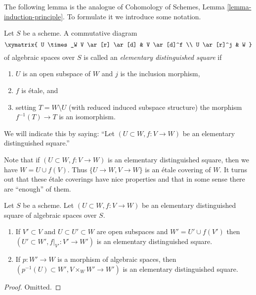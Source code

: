 \noindent
The following lemma is the analogue of
Cohomology of Schemes, Lemma \ref{lemma-induction-principle}.
To formulate it we introduce some notation.

\begin{definition}
\label{definition-elementary-distinguished-square}
Let $S$ be a scheme. A commutative diagram
$$
\xymatrix{
U \times_W V \ar[r] \ar[d] & V \ar[d]^f \\
U \ar[r]^j & W
}
$$
of algebraic spaces over $S$ is called an {\it elementary distinguished square}
if
\begin{enumerate}
\item $U$ is an open subspace of $W$ and $j$ is the inclusion morphism,
\item $f$ is \'etale, and
\item setting $T = W \setminus U$ (with reduced induced
subspace structure) the morphism $f^{-1}(T) \to T$ is an isomorphism.
\end{enumerate}
We will indicate this by saying: ``Let $(U \subset W, f : V \to W)$
be an elementary distinguished square.''
\end{definition}

\noindent
Note that if $(U \subset W, f : V \to W)$ is an elementary distinguished
square, then we have $W = U \cup f(V)$. Thus $\{U \to W, V \to W\}$ is
an \'etale covering of $W$. It turns out that these \'etale coverings
have nice properties and that in some sense
there are ``enough'' of them.

\begin{lemma}
\label{lemma-make-more-elementary-distinguished-squares}
Let $S$ be a scheme. Let $(U \subset W, f : V \to W)$ be an elementary
distinguished square of algebraic spaces over $S$.
\begin{enumerate}
\item If $V' \subset V$ and
$U \subset U' \subset W$ are open subspaces and $W' = U' \cup f(V')$
then $(U' \subset W', f|_{V'} : V' \to W')$ is an elementary distinguished
square.
\item If $p : W' \to W$ is a morphism of algebraic spaces, then
$(p^{-1}(U) \subset W', V \times_W W' \to W')$ is an elementary distinguished
square.
\end{enumerate}
\end{lemma}

\begin{proof}
Omitted.
\end{proof}

